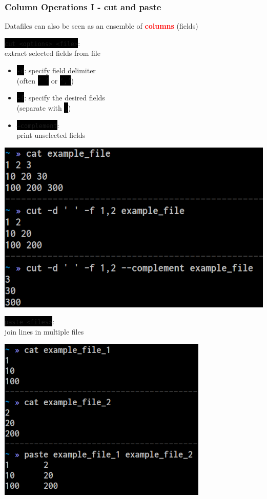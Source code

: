 \documentclass[unknownkeysallowed, 10pt, a4 paper, handout]{beamer}
\newcommand{\focus}[1]{\textbf{\textcolor{red}{#1}}}
\newcommand{\code}[1]{\colorbox{black}{\color{green}\texttt{#1}}}
\newcommand{\sidebyside}[5]{
  \begin{minipage}{#1\textwidth}
    #2
  \end{minipage} #3 \begin{minipage}{#4\textwidth}
    #5
  \end{minipage}
}
\begin{document}
\begin{frame}
  \begin{center}
    \frametitle{Column Operations I - cut and paste}

    Datafiles can also be seen as an ensemble of \focus{columns} (fields)

    \sidebyside{0.50}{
      \code{cut <options> <file>}:\\
      extract selected fields from file

      \begin{itemize}
        \item \code{-d}: specify field delimiter\\
          (often \code{' '} or \code{','})
        \item \code{-f}: specify the desired fields\\
          (separate with \code{,})
        \item \code{--complement}:\\
          print unselected fields
      \end{itemize}
    }{\hfill}{0.46}{
      \begin{center}
        \includegraphics[width=1.00\textwidth]{pics/cut.png}
      \end{center}
    }

    \vspace{-4mm}

    \sidebyside{0.49}{
      \code{paste <files>}:\\
      join lines in multiple files
    }{\hfill}{0.48}{
      \begin{center}
        \includegraphics[width=0.75\textwidth]{pics/paste.png}
      \end{center}
    }

  \end{center}
\end{frame}
\end{document}
